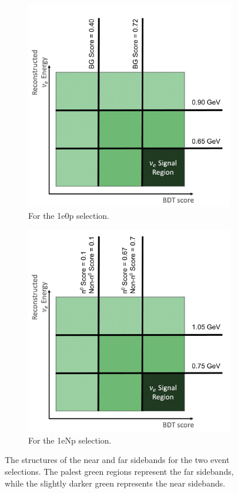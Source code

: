 \begin{figure}[H]
    \centering
    \begin{subfigure}{0.5\linewidth}
        \includegraphics[width=\linewidth]{technote/Sidebands/Figures/ZpNearAndFarSidebands.pdf}
        \caption{For the 1e0p selection.}
    \end{subfigure}%
    \begin{subfigure}{0.5\linewidth}
        \includegraphics[width=\linewidth]{technote/Sidebands/Figures/NpNearAndFarSidebands.pdf}
        \caption{For the 1eNp selection.}
    \end{subfigure}
    \caption{The structures of the near and far sidebands for the two event selections. The palest green regions represent the far sidebands, while the slightly darker green represents the near sidebands.}
    \label{fig:SidebandStructure}
\end{figure}





